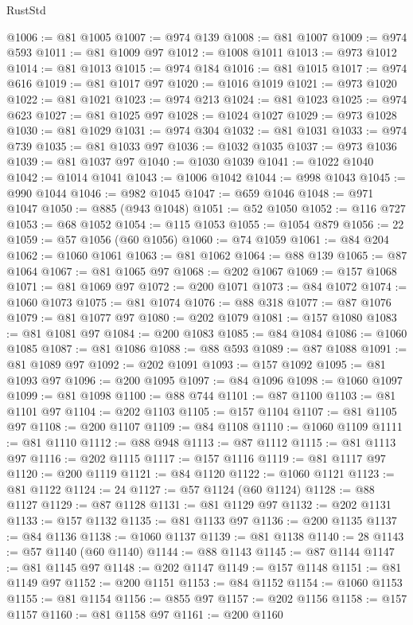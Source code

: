 \begin{lexlean}{RustStd}
\begin{coremodule}
@1006 := @81 @1005
@1007 := @974 @139
@1008 := @81 @1007
@1009 := @974 @593
@1011 := @81 @1009 @97
@1012 := @1008 @1011
@1013 := @973 @1012
@1014 := @81 @1013
@1015 := @974 @184
@1016 := @81 @1015
@1017 := @974 @616
@1019 := @81 @1017 @97
@1020 := @1016 @1019
@1021 := @973 @1020
@1022 := @81 @1021
@1023 := @974 @213
@1024 := @81 @1023
@1025 := @974 @623
@1027 := @81 @1025 @97
@1028 := @1024 @1027
@1029 := @973 @1028
@1030 := @81 @1029
@1031 := @974 @304
@1032 := @81 @1031
@1033 := @974 @739
@1035 := @81 @1033 @97
@1036 := @1032 @1035
@1037 := @973 @1036
@1039 := @81 @1037 @97
@1040 := @1030 @1039
@1041 := @1022 @1040
@1042 := @1014 @1041
@1043 := @1006 @1042
@1044 := @998 @1043
@1045 := @990 @1044
@1046 := @982 @1045
@1047 := @659 @1046
@1048 := @971 @1047
@1050 := @885 (@943 @1048)
@1051 := @52 @1050
@1052 := @116 @727
@1053 := @68 @1052
@1054 := @115 @1053
@1055 := @1054 @879
@1056 := 22
@1059 := @57 @1056 (@60 @1056)
@1060 := @74 @1059
@1061 := @84 @204
@1062 := @1060 @1061
@1063 := @81 @1062
@1064 := @88 @139
@1065 := @87 @1064
@1067 := @81 @1065 @97
@1068 := @202 @1067
@1069 := @157 @1068
@1071 := @81 @1069 @97
@1072 := @200 @1071
@1073 := @84 @1072
@1074 := @1060 @1073
@1075 := @81 @1074
@1076 := @88 @318
@1077 := @87 @1076
@1079 := @81 @1077 @97
@1080 := @202 @1079
@1081 := @157 @1080
@1083 := @81 @1081 @97
@1084 := @200 @1083
@1085 := @84 @1084
@1086 := @1060 @1085
@1087 := @81 @1086
@1088 := @88 @593
@1089 := @87 @1088
@1091 := @81 @1089 @97
@1092 := @202 @1091
@1093 := @157 @1092
@1095 := @81 @1093 @97
@1096 := @200 @1095
@1097 := @84 @1096
@1098 := @1060 @1097
@1099 := @81 @1098
@1100 := @88 @744
@1101 := @87 @1100
@1103 := @81 @1101 @97
@1104 := @202 @1103
@1105 := @157 @1104
@1107 := @81 @1105 @97
@1108 := @200 @1107
@1109 := @84 @1108
@1110 := @1060 @1109
@1111 := @81 @1110
@1112 := @88 @948
@1113 := @87 @1112
@1115 := @81 @1113 @97
@1116 := @202 @1115
@1117 := @157 @1116
@1119 := @81 @1117 @97
@1120 := @200 @1119
@1121 := @84 @1120
@1122 := @1060 @1121
@1123 := @81 @1122
@1124 := 24
@1127 := @57 @1124 (@60 @1124)
@1128 := @88 @1127
@1129 := @87 @1128
@1131 := @81 @1129 @97
@1132 := @202 @1131
@1133 := @157 @1132
@1135 := @81 @1133 @97
@1136 := @200 @1135
@1137 := @84 @1136
@1138 := @1060 @1137
@1139 := @81 @1138
@1140 := 28
@1143 := @57 @1140 (@60 @1140)
@1144 := @88 @1143
@1145 := @87 @1144
@1147 := @81 @1145 @97
@1148 := @202 @1147
@1149 := @157 @1148
@1151 := @81 @1149 @97
@1152 := @200 @1151
@1153 := @84 @1152
@1154 := @1060 @1153
@1155 := @81 @1154
@1156 := @855 @97
@1157 := @202 @1156
@1158 := @157 @1157
@1160 := @81 @1158 @97
@1161 := @200 @1160

\end{coremodule}
\end{lexlean}
